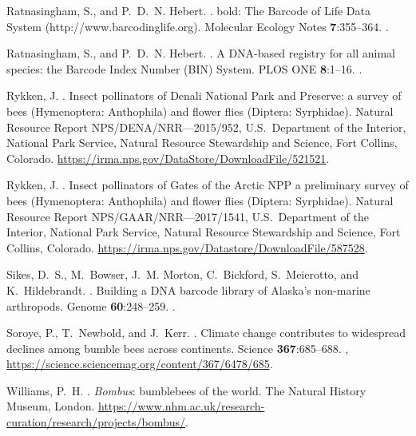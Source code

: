 \begin{multicols}{2}
\begin{thebibliography}{24}
Ratnasingham, S., and P.~D.~N. Hebert.
.
\newblock bold: The Barcode of Life Data System (http://www.barcodinglife.org).
\newblock Molecular Ecology Notes {\bfseries 7}:355--364.
\newblock {}.

Ratnasingham, S., and P.~D.~N. Hebert.
.
\newblock A DNA-based registry for all animal species: the Barcode Index Number
  (BIN) System.
\newblock PLOS ONE {\bfseries 8}:1--16.
\newblock {}.

Rykken, J.
.
\newblock Insect pollinators of Denali National Park and Preserve: a survey of
  bees (Hymenoptera: Anthophila) and flower flies (Diptera: Syrphidae).
\newblock Natural Resource Report NPS/DENA/NRR—2015/952, U.S.\ Department of
  the Interior, National Park Service, Natural Resource Stewardship and
  Science, Fort Collins, Colorado.
\newblock \urlprefix\url{https://irma.nps.gov/DataStore/DownloadFile/521521}.

Rykken, J.
.
\newblock Insect pollinators of Gates of the Arctic NPP a preliminary survey of
  bees (Hymenoptera: Anthophila) and flower flies (Diptera: Syrphidae).
\newblock Natural Resource Report NPS/GAAR/NRR—2017/1541, U.S.\ Department of
  the Interior, National Park Service, Natural Resource Stewardship and
  Science, Fort Collins, Colorado.
\newblock \urlprefix\url{https://irma.nps.gov/Datastore/DownloadFile/587528}.

Sikes, D.~S., M.~Bowser, J.~M. Morton, C.~Bickford, S.~Meierotto, and
  K.~Hildebrandt.
.
\newblock Building a DNA barcode library of Alaska’s non-marine arthropods.
\newblock Genome {\bfseries 60}:248--259.
\newblock {}.

Soroye, P., T.~Newbold, and J.~Kerr.
.
\newblock Climate change contributes to widespread declines among bumble bees
  across continents.
\newblock Science {\bfseries 367}:685--688.
\newblock {},
  \urlprefix\url{https://science.sciencemag.org/content/367/6478/685}.

Williams, P.~H.
.
\newblock \textit{Bombus}: bumblebees of the world.
\newblock The Natural History Museum, London.
\newblock
  \urlprefix\url{https://www.nhm.ac.uk/research-curation/research/projects/bombus/}.


\end{thebibliography}
\end{multicols}
